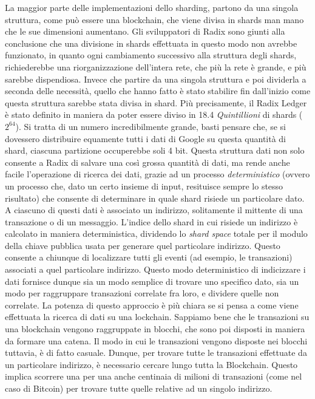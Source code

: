 La maggior parte delle implementazioni dello sharding, partono da una singola struttura, come può essere una blockchain, che viene divisa in shards man mano che le sue dimensioni aumentano. Gli sviluppatori di Radix sono giunti alla conclusione che una divisione in shards effettuata in questo modo non avrebbe funzionato, in quanto ogni cambiamento successivo alla struttura degli shards, richiederebbe una riorganizzazione dell'intera rete, che più la rete è grande, e più sarebbe dispendiosa. Invece che partire da una singola struttura e poi dividerla a seconda delle necessità, quello che hanno fatto è stato stabilire fin dall'inizio come questa struttura sarebbe stata divisa in shard. 
Più precisamente, il Radix Ledger è stato definito in maniera da poter essere diviso in 18.4 \textit{Quintillioni} di shards ($2^{64}$). Si tratta di un numero incredibilmente grande, basti pensare che, se si dovessero distribuire equamente tutti i dati di Google su questa quantità di shard, ciascuna partizione occuperebbe soli 4 bit. Questa struttura dati non solo consente a Radix di salvare una così grossa quantità di dati, ma rende anche facile l'operazione di ricerca dei dati, grazie ad un processo \textit{deterministico} (ovvero un processo che, dato un certo insieme di input, resituisce sempre lo stesso risultato) che consente di determinare in quale shard risiede un particolare dato. A ciascuno di questi dati è associato un indirizzo, solitamente il mittente di una transazione o di un messaggio. L'indice dello shard in cui risiede un indirizzo è calcolato in maniera deterministica, dividendo lo \textit{shard space} totale per il modulo della chiave pubblica usata per generare quel particolare indirizzo. Questo consente a chiunque di localizzare tutti gli eventi (ad esempio, le transazioni) associati a quel particolare indirizzo. Questo modo deterministico di indicizzare i dati fornisce dunque sia un modo semplice di trovare uno specifico dato, sia un modo per raggruppare transazioni correlate fra loro, e dividere quelle non correlate. La potenza di questo approccio è più chiara se si pensa a come viene effettuata la ricerca di dati su una lockchain. 
Sappiamo bene che le transazioni su una blockchain vengono raggruppate in blocchi, che sono poi disposti in maniera da formare una catena. Il modo in cui le transazioni vengono disposte nei blocchi tuttavia, è di fatto casuale. Dunque, per trovare tutte le transazioni effettuate da un particolare indirizzo, è necessario cercare lungo tutta la Blockchain. Questo implica scorrere una per una anche centinaia di milioni di transazioni (come nel caso di Bitcoin) per trovare tutte quelle relative ad un singolo indirizzo.
